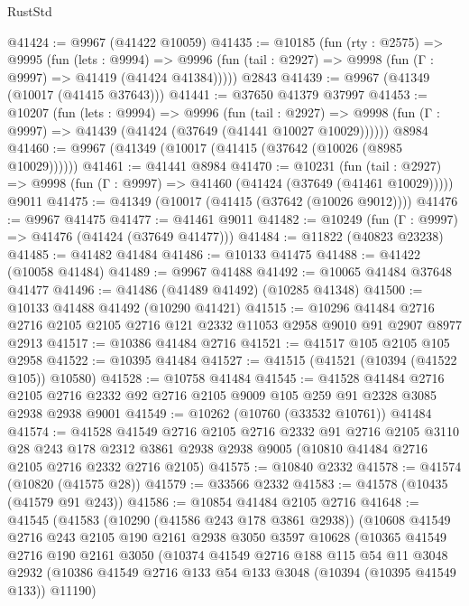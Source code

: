 \begin{lexlean}{RustStd}
\begin{coremodule}
@41424 := @9967 (@41422 @10059)
@41435 := @10185
    (fun (rty : @2575) =>
    @9995
      (fun (lets : @9994) =>
      @9996 (fun (tail : @2927) => @9998 (fun (Γ : @9997) => @41419 (@41424 @41384)))))
    @2843
@41439 := @9967 (@41349 (@10017 (@41415 @37643)))
@41441 := @37650 @41379 @37997
@41453 := @10207
    (fun (lets : @9994) =>
    @9996
      (fun (tail : @2927) =>
      @9998 (fun (Γ : @9997) => @41439 (@41424 (@37649 (@41441 @10027 @10029))))))
    @8984
@41460 := @9967 (@41349 (@10017 (@41415 (@37642 (@10026 (@8985 @10029))))))
@41461 := @41441 @8984
@41470 := @10231
    (fun (tail : @2927) => @9998 (fun (Γ : @9997) => @41460 (@41424 (@37649 (@41461 @10029)))))
    @9011
@41475 := @41349 (@10017 (@41415 (@37642 (@10026 @9012))))
@41476 := @9967 @41475
@41477 := @41461 @9011
@41482 := @10249 (fun (Γ : @9997) => @41476 (@41424 (@37649 @41477)))
@41484 := @11822 (@40823 @23238)
@41485 := @41482 @41484
@41486 := @10133 @41475
@41488 := @41422 (@10058 @41484)
@41489 := @9967 @41488
@41492 := @10065 @41484 @37648 @41477
@41496 := @41486 (@41489 @41492) (@10285 @41348)
@41500 := @10133 @41488 @41492 (@10290 @41421)
@41515 := @10296
    @41484
    @2716
    @2716
    @2105
    @2105
    @2716
    @121
    @2332
    @11053
    @2958
    @9010
    @91
    @2907
    @8977
    @2913
@41517 := @10386 @41484 @2716
@41521 := @41517 @105 @2105 @105 @2958
@41522 := @10395 @41484
@41527 := @41515 (@41521 (@10394 (@41522 @105)) @10580)
@41528 := @10758 @41484
@41545 := @41528
    @41484
    @2716
    @2105
    @2716
    @2332
    @92
    @2716
    @2105
    @9009
    @105
    @259
    @91
    @2328
    @3085
    @2938
    @2938
    @9001
@41549 := @10262 (@10760 (@33532 @10761)) @41484
@41574 := @41528
    @41549
    @2716
    @2105
    @2716
    @2332
    @91
    @2716
    @2105
    @3110
    @28
    @243
    @178
    @2312
    @3861
    @2938
    @2938
    @9005
    (@10810 @41484 @2716 @2105 @2716 @2332 @2716 @2105)
@41575 := @10840 @2332
@41578 := @41574 (@10820 (@41575 @28))
@41579 := @33566 @2332
@41583 := @41578 (@10435 (@41579 @91 @243))
@41586 := @10854 @41484 @2105 @2716
@41648 := @41545
    (@41583
      (@10290 (@41586 @243 @178 @3861 @2938))
      (@10608
        @41549
        @2716
        @243
        @2105
        @190
        @2161
        @2938
        @3050
        @3597
        @10628
        (@10365
          @41549
          @2716
          @190
          @2161
          @3050
          (@10374
            @41549
            @2716
            @188
            @115
            @54
            @11
            @3048
            @2932
            (@10386 @41549 @2716 @133 @54 @133 @3048 (@10394 (@10395 @41549 @133)) @11190)

\end{coremodule}
\end{lexlean}
